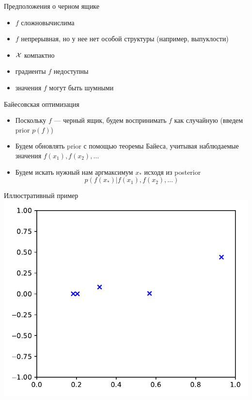 \documentclass[fullscreen=true, bookmarks=true, hyperref={pdfencoding=unicode}]{beamer}
\begin{document}
\begin{frame}{Предположения о черном ящике}
    \begin{itemize}
        \item<1-> $f$ сложновычислима
        \item<2-> $f$ непрерывная, но у нее нет особой структуры (например, выпуклости)
        \item<3-> $\mathcal{X}$ компактно
        \item<3-> градиенты $f$ недоступны
        \item<4-> значения $f$ могут быть шумными
    \end{itemize}
\end{frame}

\begin{frame}{Байесовская оптимизация}
    \begin{itemize}
        \item<1-> Поскольку $f$ --- черный ящик, будем воспринимать $f$ как случайную (введем prior $p(f)$)
        \item<2-> Будем обновлять prior с помощью теоремы Байеса, учитывая наблюдаемые значения $f(x_1), f(x_2), \ldots$
        \item<3-> Будем искать нужный нам аргмаксимум $x_*$ исходя из posterior
        $$ p(f(x_*) | f(x_1), f(x_2), \ldots) $$
    \end{itemize}
\end{frame}




\begin{frame}{Иллюстративный пример}
\includegraphics[width=\textwidth]{01_bayesopt_data.pdf}
\end{frame}
\end{document}
